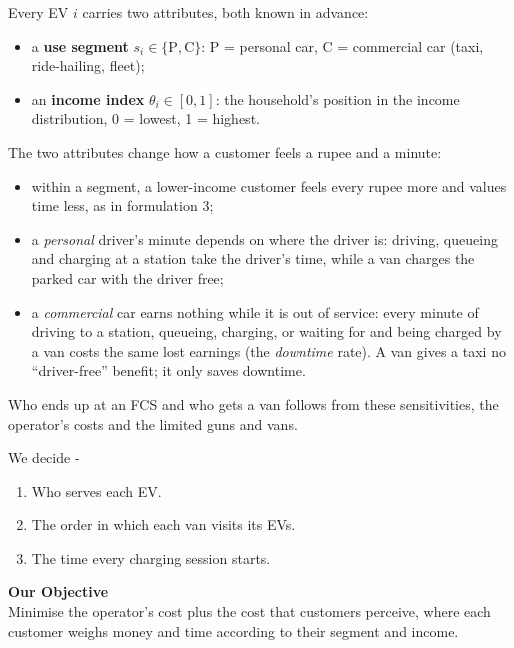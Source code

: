 \documentclass[12pt,a4paper]{article}
\begin{document}
Every EV $i$ carries two attributes, both known in advance:
\begin{itemize}[itemsep=1pt]
  \item a \textbf{use segment} $s_i\in\{\mathrm P,\mathrm C\}$: P = personal car, C = commercial car (taxi, ride-hailing, fleet);
  \item an \textbf{income index} $\theta_i\in[0,1]$: the household's position in the income distribution, 0 = lowest, 1 = highest.
\end{itemize}
The two attributes change how a customer feels a rupee and a minute:
\begin{itemize}[itemsep=1pt]
  \item within a segment, a lower-income customer feels every rupee more and values time less, as in formulation 3;
  \item a \emph{personal} driver's minute depends on where the driver is: driving, queueing and charging at a station take the driver's time, while a van charges the parked car with the driver free;
  \item a \emph{commercial} car earns nothing while it is out of service: every minute of driving to a station, queueing, charging, or waiting for and being charged by a van costs the same lost earnings (the \emph{downtime} rate). A van gives a taxi no ``driver-free'' benefit; it only saves downtime.
\end{itemize}
Who ends up at an FCS and who gets a van follows from these sensitivities, the operator's costs and the limited guns and vans.

We decide -
\begin{enumerate}[itemsep=2pt]
  \item Who serves each EV.
  \item The order in which each van visits its EVs.
  \item The time every charging session starts.
\end{enumerate}

\begin{objbox}
{\color{headblue}\textbf{Our Objective}}\\
Minimise the operator's cost plus the cost that customers perceive, where each customer weighs money and time according to their segment and income.
\end{objbox}

\end{document}
